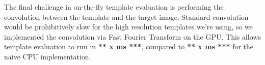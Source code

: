 \documentclass[10pt,twocolumn,letterpaper]{article}
\newcommand{\scream}[1]{{\color{red} \bf *** #1 ***}}
\begin{document}
The final challenge in on-the-fly template evaluation is performing the
convolution between the template and the target image. Standard convolution
would be prohibitively slow for the high resolution templates we're using, so we
implemented the convolution via Fast Fourier Transform on the GPU. This allows
template evaluation to run in \scream{x ms}, compared to \scream{x ms} for the
naive CPU implementation.

  







\end{document}
